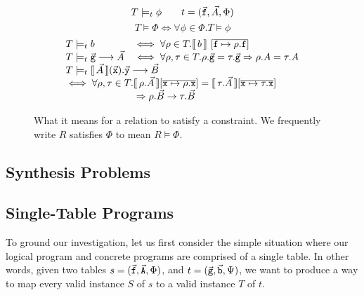 \begin{figure}[tph]
  \[T \models_t \phi \qquad t = (\vec{\texttt{f}}, \vec A, \Phi)\]
  \[T \models \Phi \iff \forall \phi \in \Phi. T \models \phi \]
  \[\begin{array}{ll}
      T \models_t b &\iff \forall \rho \in T. \bracbb{b}~[\overline{\var f \mapsto \rho.\var{f}}]\\

      T \models_t \vec{\var g} \longrightarrow \vec A & \iff \forall \rho, \tau \in T. \rho.\vec{\var g} = \tau.\vec{\var g} \Rightarrow
                                                        \rho.A = \tau.A \\
      
      \multicolumn 2 l {T \models_t \bracbb{\vec A}(\vec{\var x}).\vec{\var y}
      \longrightarrow \vec B} \\
      \multicolumn 2 l {\iff \forall \rho, \tau \in
    T. \bracbb{\rho.\vec A}[\overline{\var x \mapsto \rho.\var x}] =
    \bracbb{\tau.\vec A}[\overline{\var x \mapsto \tau.\var
      x}]}
      \\ \multicolumn 2 l {\phantom{\iff \forall \rho, \tau \in T.} \Rightarrow \rho.\vec B \rightarrow \tau.\vec B}
    \end{array}\]
  \caption{What it means for a relation to satisfy a constraint. We
    frequently write $R$ satisfies $\Phi$ to mean $R \models \Phi$.}
  \label{fig:conditions-semantics}
\end{figure}

\subsection{Synthesis Problems}


\subsection{Single-Table Programs}

To ground our investigation, let us first consider the simple
situation where our logical program and concrete programs are
comprised of a single table. In other words, given two tables
$s = (\vec{\texttt{f}}, \vec{\texttt{A}}, \Phi)$, and
$t = (\vec{\texttt{g}}, \vec{\texttt{b}}, \Psi)$, we want to produce a way to
map every valid instance $S$ of $s$ to a valid instance $T$ of $t$.

